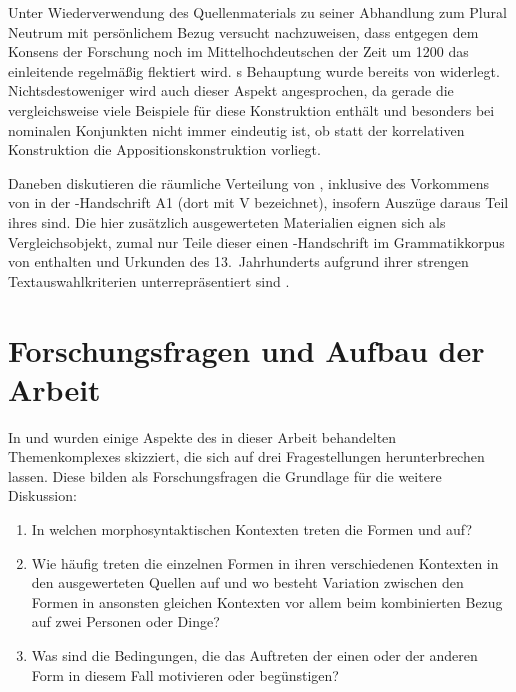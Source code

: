 Unter Wiederverwendung des Quellenmaterials zu seiner Abhandlung zum Plural
Neutrum mit persönlichem Bezug \autocite{askedal1973} versucht
\citet{askedal1974} nachzuweisen, dass entgegen dem Konsens der Forschung
\autocites[vgl.~z.\,B.][433]{behaghel1923}[133]{dal2014}[626]{ksw2} noch im
Mittelhochdeutschen der Zeit um 1200 das einleitende
 regelmäßig flektiert wird. \citeauthor{askedal1974}s Behauptung
wurde bereits von \citet{gjelsten1980} widerlegt. Nichtsdestoweniger wird auch
dieser Aspekt angesprochen, da gerade die \KC{} vergleichsweise viele Beispiele
für diese Konstruktion enthält und besonders bei nominalen Konjunkten nicht
immer eindeutig ist, ob statt der korrelativen Konstruktion die
Appositionskonstruktion 
vorliegt.

Daneben diskutieren \citet[627--628]{ksw2} die räumliche
Verteilung von ,
inklusive des Vorkommens von  in der \KC{}-Handschrift A1 (dort mit
V bezeichnet), insofern Auszüge daraus Teil ihres  sind. Die hier
zusätzlich ausgewerteten Materialien eignen sich als Vergleichsobjekt, zumal
nur Teile dieser einen \KC{}-Handschrift im Grammatikkorpus von
\citet{ksw3,ksw2} enthalten und Urkunden des 13.~Jahrhunderts
aufgrund ihrer strengen Text\-auswahl\-kriterien unterrepräsentiert sind
\autocite[1309, 1311]{wegera2000}.


\section{Forschungsfragen und Aufbau der Arbeit}

In  und  wurden einige
Aspekte des in dieser Arbeit behandelten Themenkomplexes skizziert, die sich
auf drei Fragestellungen herunterbrechen lassen. Diese bilden als
Forschungsfragen die Grundlage für die weitere Diskussion:

\begin{enumerate}
	\item In welchen morphosyntaktischen Kontexten treten die Formen
		 und  auf?
	\item Wie häufig treten die einzelnen Formen in ihren verschiedenen
		Kontexten in den ausgewerteten Quellen auf und wo besteht Variation
		zwischen den Formen in ansonsten gleichen Kontexten vor allem beim
		kombinierten Bezug auf zwei Personen oder Dinge?
	\item Was sind die Bedingungen, die das Auftreten der einen
		oder der anderen Form in diesem Fall motivieren oder begünstigen?
\end{enumerate}

